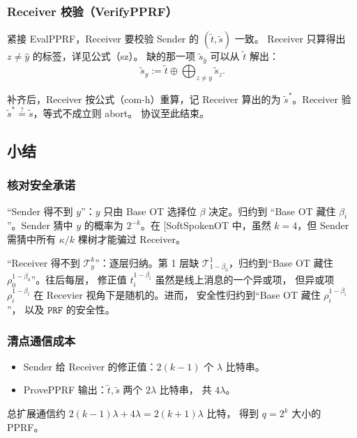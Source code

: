 \subsubsection{Receiver 校验（VerifyPPRF）}

紧接 EvalPPRF，Receiver 要校验 Sender 的 $(\tilde t, \tilde s)$ 一致。
Receiver 只算得出 $z\ne \hat y$ 的标签，详见公式（sz）。
缺的那一项 $\tilde s_{\hat y}$ 可以从 $\tilde t$ 解出：
\begin{equation}\label{eq:04-pprf:sy}
\tilde s_y := \tilde t \oplus \bigoplus_{z \ne y} \tilde s_z. \tag{sy}
\end{equation}

补齐后，Receiver 按公式（com-h）重算，记 Receiver
算出的为 $\tilde s^*$。Receiver
验 $\tilde s^* \stackrel{?}{=} \tilde s$，等式不成立则 abort。
协议至此结束。

\subsection{小结}
\subsubsection{核对安全承诺}

“Sender 得不到 $y$”：$y$ 只由 Base OT 选择位 $\beta$ 决定。归约到
“Base OT 藏住 $\beta_i$”。Sender 猜中 $y$ 的概率为 $2^{-k}$。在
{[}SoftSpokenOT 中，虽然 $k=4$，但 Sender
需猜中所有 $\kappa/k$ 棵树才能骗过 Receiver。

“Receiver 得不到 $\mathcal{T}^k_y$”：逐层归纳。第 1
层缺 $\mathcal{T}^1_{1-\beta_0}$，归约到“Base OT
藏住 $\rho_0^{1-\beta_0}$”。往后每层，
修正值 $t_i^{1-\beta_i}$ 虽然是线上消息的一个异或项，
但异或项 $\rho_i^{1-\beta_i}$ 在 Recevier 视角下是随机的。进而，
安全性归约到“Base OT 藏住 $\rho_i^{1-\beta_i}$”，
以及 $\mathtt{PRF}$ 的安全性。

\subsubsection{清点通信成本}

\begin{itemize}

\item
  Sender 给 Receiver 的修正值：$2(k-1)$ 个 $\lambda$ 比特串。
\item
  ProvePPRF 输出：$\tilde t, \tilde s$ 两个 $2\lambda$ 比特串，
  共 $4\lambda$。
\end{itemize}

总扩展通信约 $2(k-1)\lambda + 4\lambda = 2(k+1)\lambda$ 比特，
得到 $q = 2^k$ 大小的 PPRF。

